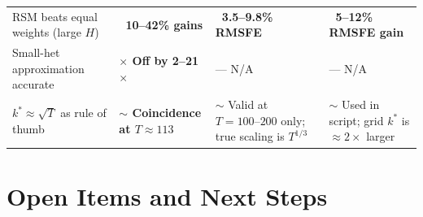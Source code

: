 \documentclass[11pt,a4paper]{article}
\newcommand{\ck}[1]{\textcolor{mygreen}{\textbf{#1}}}
\newcommand{\pa}[1]{\textcolor{myamber}{\textbf{#1}}}
\newcommand{\no}[1]{\textcolor{myred}{\textbf{#1}}}
\newcommand{\na}{\textcolor{dgrey}{--- N/A}}
\newcommand{\kstar}{k^*}
\begin{document}
\begin{tabular}{L{4.2cm} L{3.1cm} L{3.1cm} L{3.5cm}}
RSM beats equal weights (large \(H\)) &
\ck{\checkmark\ 10--42\% gains} &
\ck{\checkmark\ 3.5--9.8\% RMSFE} &
\ck{\checkmark\ 5--12\% RMSFE gain} \\

Small-het approximation accurate &
\no{\(\times\) Off by 2--21\(\times\)}  &
\na &
\na \\

\(\kstar\approx\sqrt{T}\) as rule of thumb &
\pa{\(\sim\) Coincidence at \(T\approx113\)} &
\pa{\(\sim\) Valid at \(T=100\text{--}200\) only;\newline true scaling is \(T^{1/3}\)} &
\pa{\(\sim\) Used in script;\newline grid \(\kstar\) is \(\approx2\times\) larger} \\
\end{tabular}

\section{Open Items and Next Steps}
\end{document}
